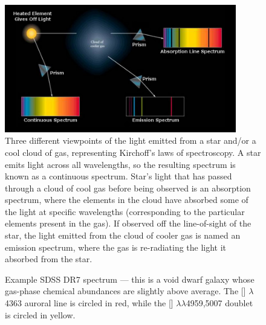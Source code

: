 




\begin{figure}
    \includegraphics[width=0.9\textwidth]{Images/Intro/Kirchoff}
    \caption[Kirchoff's laws of spectroscopy]{Three different viewpoints of the 
    light emitted from a star and/or a cool cloud of gas, representing 
    Kirchoff's laws of spectroscopy.  A star emits light across all wavelengths, 
    so the resulting spectrum is known as a continuous spectrum.  Star's light 
    that has passed through a cloud of cool gas before being observed is an 
    absorption spectrum, where the elements in the cloud have absorbed some of 
    the light at specific wavelengths (corresponding to the particular elements 
    present in the gas).  If observed off the line-of-sight of the star, the 
    light emitted from the cloud of cooler gas is named an emission spectrum, 
    where the gas is re-radiating the light it absorbed from the star.}
\end{figure}

\begin{figure}
    \caption[Sample (void) dwarf galaxy spectrum]{Example SDSS DR7 spectrum --- 
    this is a void dwarf galaxy whose gas-phase chemical abundances are slightly 
    above average.  The [] $\lambda$4363 auroral line is circled in 
    red, while the [] $\lambda \lambda$4959,5007 doublet is circled in 
    yellow.}
\end{figure}


